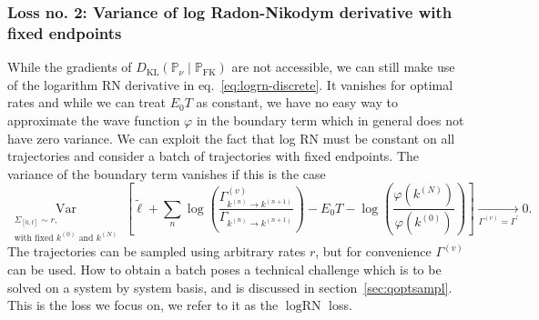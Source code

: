 \subsubsection{Loss no. 2: Variance of log Radon-Nikodym derivative with fixed endpoints}
While the gradients of $D_{\mathrm{KL}}\left(\mathbb{P}_{\nu} \mid \mathbb{P}_{\mathrm{FK}}\right)$ are not accessible, we can still make use of the logarithm RN derivative in eq.~\eqref{eq:logrn-discrete}. It vanishes for optimal rates and while we can treat $E_0 T$ as constant, we have no easy way to approximate the wave function $\varphi$ in the boundary term which in general does not have zero variance. We can exploit the fact that log RN must be constant on all trajectories and consider a batch of trajectories with fixed endpoints. The variance of the boundary term vanishes if this is the case
\begin{equation}
\underset{\substack{\Sigma_{[0, t]} \sim r, \\ \text{with fixed } k^{(0)} \text{ and } k^{(N)}}}{\operatorname{Var}}\left[\tilde \ell
+\sum_{n} \log \left(\frac{\Gamma_{k^{(n)} \rightarrow k^{(n+1)}}^{(v)}}{\Gamma_{k^{(n)} \rightarrow k^{(n+1)}}}\right)-E_{0} T-\log \left(\frac{\varphi(k^{(N)})}{\varphi(k^{(0)})}\right)
\right] \underset{\Gamma^{(v)} = \Gamma^\prime}{\rightarrow} 0.
\end{equation}
The trajectories can be sampled using arbitrary rates $r$, but for convenience $\Gamma^{(v)}$ can be used. How to obtain a batch poses a technical challenge which is to be solved on a system by system basis, and is discussed in section~\ref{sec:qoptsampl}. This is the loss we focus on, we refer to it as the $\log \text{RN}$ loss. 
